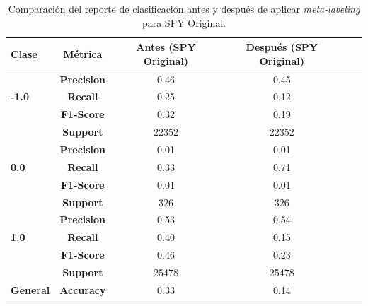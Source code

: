 \documentclass[a4paper,12pt, twoside]{report}
\begin{document}
\begin{table}[h!]
    \centering
    \begin{tabular}{lccccc}
    \hline
    \textbf{Clase} & \textbf{Métrica} & \textbf{Antes (SPY Original)} & \textbf{Después (SPY Original)} \\
    \hline
    \multirow{3}{*}{\textbf{-1.0}} & \textbf{Precision} & 0.46 & 0.45 \\
                                   & \textbf{Recall}    & 0.25 & 0.12 \\
                                   & \textbf{F1-Score}  & 0.32 & 0.19 \\
                                   & \textbf{Support}   & 22352 & 22352 \\
    \hline
    \multirow{3}{*}{\textbf{0.0}} & \textbf{Precision}  & 0.01 & 0.01 \\
                                  & \textbf{Recall}     & 0.33 & 0.71 \\
                                  & \textbf{F1-Score}   & 0.01 & 0.01 \\
                                  & \textbf{Support}    & 326 & 326 \\
    \hline
    \multirow{3}{*}{\textbf{1.0}} & \textbf{Precision}  & 0.53 & 0.54 \\
                                  & \textbf{Recall}     & 0.40 & 0.15 \\
                                  & \textbf{F1-Score}   & 0.46 & 0.23 \\
                                  & \textbf{Support}    & 25478 & 25478 \\
    \hline
    \textbf{General} & \textbf{Accuracy} & 0.33 & 0.14 \\
    \hline
    \end{tabular}
    \caption{Comparación del reporte de clasificación antes y después de aplicar \textit{meta-labeling} para SPY Original.}
    \label{tab:classification_report_spy_original}
\end{table}
    
\end{document}
